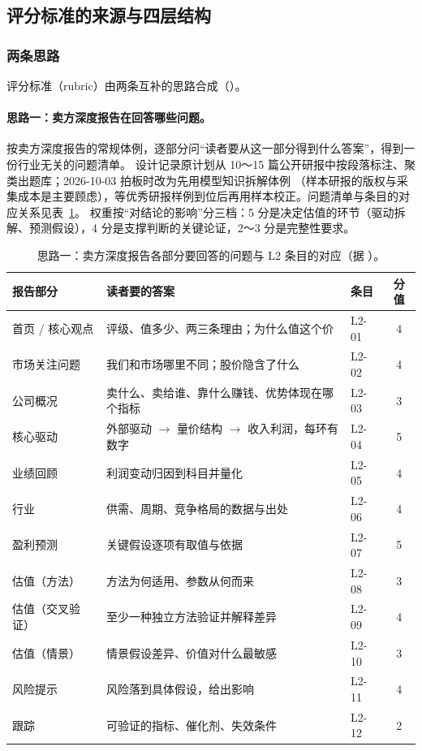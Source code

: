 \subsection{评分标准的来源与四层结构}
\label{sec:eval-rubric}

\subsubsection{两条思路}

评分标准（rubric）由两条互补的思路合成（）。

\paragraph{思路一：卖方深度报告在回答哪些问题。}
按卖方深度报告的常规体例，逐部分问“读者要从这一部分得到什么答案”，得到一份行业无关的问题清单。
设计记录原计划从 10～15 篇公开研报中按段落标注、聚类出题库；2026-10-03 拍板时改为先用模型知识拆解体例
（样本研报的版权与采集成本是主要顾虑），等优秀研报样例到位后再用样本校正。问题清单与条目的对应关系见表~\ref{tab:eval-l2-origin}。
权重按“对结论的影响”分三档：5 分是决定估值的环节（驱动拆解、预测假设），4 分是支撑判断的关键论证，2～3 分是完整性要求。

\begin{table}[t]
\centering
\caption{思路一：卖方深度报告各部分要回答的问题与 L2 条目的对应（据 ）。}
\label{tab:eval-l2-origin}
\small
\begin{tabularx}{\linewidth}{@{}l X l c@{}}
\toprule
报告部分 & 读者要的答案 & 条目 & 分值 \\
\midrule
首页 / 核心观点 & 评级、值多少、两三条理由；为什么值这个价 & L2-01 & 4 \\
市场关注问题 & 我们和市场哪里不同；股价隐含了什么 & L2-02 & 4 \\
公司概况 & 卖什么、卖给谁、靠什么赚钱、优势体现在哪个指标 & L2-03 & 3 \\
核心驱动 & 外部驱动 $\to$ 量价结构 $\to$ 收入利润，每环有数字 & L2-04 & 5 \\
业绩回顾 & 利润变动归因到科目并量化 & L2-05 & 4 \\
行业 & 供需、周期、竞争格局的数据与出处 & L2-06 & 4 \\
盈利预测 & 关键假设逐项有取值与依据 & L2-07 & 5 \\
估值（方法） & 方法为何适用、参数从何而来 & L2-08 & 3 \\
估值（交叉验证） & 至少一种独立方法验证并解释差异 & L2-09 & 4 \\
估值（情景） & 情景假设差异、价值对什么最敏感 & L2-10 & 3 \\
风险提示 & 风险落到具体假设，给出影响 & L2-11 & 4 \\
跟踪 & 可验证的指标、催化剂、失效条件 & L2-12 & 2 \\
\bottomrule
\end{tabularx}
\end{table}

